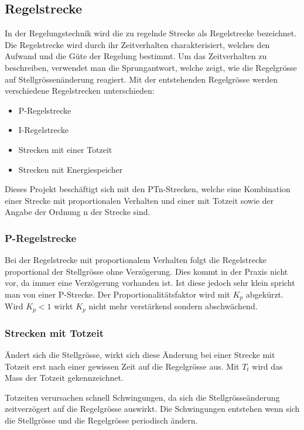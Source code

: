 \subsection{Regelstrecke}
In  der  Regelungstechnik  wird  die  zu  regelnde  Strecke  als  Regelstrecke
bezeichnet. Die  Regelstrecke wird  durch  ihr Zeitverhalten  charakterisiert,
welches den Aufwand und die G\"ute der Regelung bestimmt. Um das Zeitverhalten
zu  beschreiben,  verwendet  man  die Sprungantwort,  welche  zeigt,  wie  die
Regelgr\"osse  auf  Stellgr\"ossen\"anderung  reagiert. Mit  der  entstehenden
Regelgr\"osse werden verschiedene Regelstrecken unterschieden:

\begin{itemize}
 \item  P-Regelstrecke
 \item I-Regelstrecke
 \item    Strecken mit einer Totzeit
 \item Strecken mit Energiespeicher
\end{itemize}

Dieses  Projekt   besch\"aftigt  sich   mit  den  PTn-Strecken,   welche  eine
Kombination einer Strecke  mit proportionalen Verhalten und  einer mit Totzeit
sowie der Angabe der Ordnung n der Strecke sind.

\subsubsection*{P-Regelstrecke}
Bei  der  Regelstrecke mit  proportionalem  Verhalten  folgt die  Regelstrecke
proportional der  Stellgr\"osse ohne  Verz\"ogerung. Dies kommt in  der Praxis
nicht vor,  da immer eine  Verz\"ogerung vorhanden ist. Ist diese  jedoch sehr
klein spricht man von  einer P-Strecke. Der Proportionalit\"atsfaktor wird mit
$K_p$ abgek\"urzt. Wird  $K_p<1$ wirkt $K_p$ nicht  mehr verst\"arkend sondern
abschw\"achend.

\subsubsection*{Strecken mit Totzeit}
\"Andert sich die Stellgr\"osse, wirkt sich diese \"Anderung bei einer Strecke
mit Totzeit erst nach einer gewissen Zeit auf die Regelgr\"osse aus. Mit $T_t$
wird das Mass der Totzeit gekennzeichnet.

Totzeiten     verursachen     schnell     Schwingungen,    da     sich     die
Stellgr\"osse\"anderung  zeitverz\"ogert auf  die Regelgr\"osse  auswirkt. Die
Schwingungen  entstehen  wenn sich  die  Stellgr\"osse  und die  Regelgr\"osse
periodisch \"andern.

